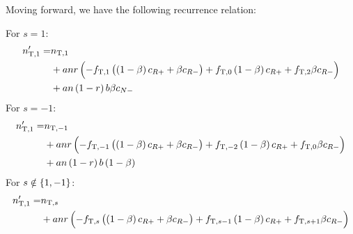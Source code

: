 \documentclass{article}
\newcommand{\tT}{\text{T}}
\begin{document}
Moving forward, we have the following recurrence relation:

For $s = 1$:
%
\begin{align*}
    n^\prime_{\tT, 1}
        = &n_{\tT, 1} \\
          &+ a n r \del{
                - f_{\tT, 1} \del{\del{1 - \beta} c_{R +} + \beta c_{R -}}
                + f_{\tT, 0} \del{1 - \beta} c_{R +}
                + f_{\tT, 2} \beta c_{R -}
          } \\
          &+ a n \del{1 - r} b \beta c_{N -}
\end{align*}
%
For $s = - 1$:
%
\begin{align*}
    n^\prime_{\tT, 1}
        = &n_{\tT, -1} \\
          &+ a n r \del{
            - f_{\tT, -1} \del{\del{1 - \beta} c_{R +} + \beta c_{R -}}
            + f_{\tT, -2} \del{1 - \beta} c_{R +}
            + f_{\tT, 0} \beta c_{R -}
          } \\
          &+ a n \del{1 - r} b \del{1 - \beta}
\end{align*}
%
For $s \notin \cbr{1, -1}$:
%
\begin{align*}
    n^\prime_{\tT, 1}
        = &n_{\tT, s} \\
          &+ a n r \del{
              - f_{\tT, s} \del{\del{1 - \beta} c_{R +} + \beta c_{R -}}
              + f_{\tT, s - 1} \del{1 - \beta} c_{R +}
              + f_{\tT, s + 1} \beta c_{R -}
          }
\end{align*}
\end{document}
